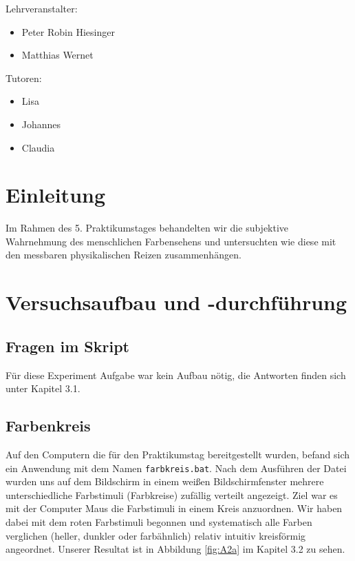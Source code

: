 \documentclass[a4paper]{article}
\begin{document}
\begin{titlepage}
{\LARGE Lehrveranstalter:}
\begin{itemize}
\item  Peter Robin Hiesinger
\item Matthias Wernet
\end{itemize}
\vspace{2.5\baselineskip}

{\LARGE Tutoren:}
\begin{itemize}
\item Lisa
\item Johannes
\item Claudia
\end{itemize}
	
\end{titlepage}


\section{Einleitung}

Im Rahmen des 5. Praktikumstages behandelten wir die subjektive Wahrnehmung des menschlichen Farbensehens und untersuchten wie diese mit den messbaren physikalischen Reizen zusammenhängen.



\section{Versuchsaufbau und -durchführung}

\subsection{Fragen im Skript}

Für diese Experiment Aufgabe war kein Aufbau nötig, die Antworten finden sich unter Kapitel 3.1.

\subsection{Farbenkreis}

Auf den Computern die für den Praktikumstag bereitgestellt wurden, befand sich ein Anwendung mit dem Namen \texttt{farbkreis.bat}. Nach dem Ausführen der Datei wurden uns auf dem Bildschirm in einem weißen Bildschirmfenster mehrere unterschiedliche Farbstimuli (Farbkreise) zufällig verteilt angezeigt. Ziel war es mit der Computer Maus die Farbstimuli in einem Kreis anzuordnen. Wir haben dabei mit dem roten Farbstimuli begonnen und systematisch alle Farben verglichen (heller, dunkler oder farbähnlich) relativ intuitiv kreisförmig angeordnet. Unserer Resultat ist in Abbildung \ref{fig:A2a} im Kapitel 3.2  zu sehen.
\end{document}
